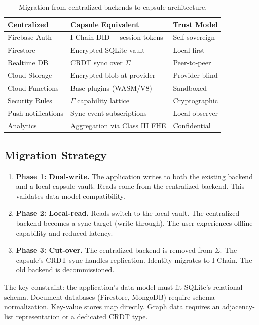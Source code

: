 \documentclass[11pt,a4paper]{article}
\begin{document}
\begin{table}[H]
\centering
\caption{Migration from centralized backends to capsule architecture.}
\label{tab:migration}
\begin{tabular}{@{}lll@{}}
\toprule
\textbf{Centralized} & \textbf{Capsule Equivalent} & \textbf{Trust Model} \\
\midrule
Firebase Auth & I-Chain DID + session tokens & Self-sovereign \\
Firestore & Encrypted SQLite vault & Local-first \\
Realtime DB & CRDT sync over $\Sigma$ & Peer-to-peer \\
Cloud Storage & Encrypted blob at provider & Provider-blind \\
Cloud Functions & Base plugins (WASM/V8) & Sandboxed \\
Security Rules & $\Gamma$ capability lattice & Cryptographic \\
Push notifications & Sync event subscriptions & Local observer \\
Analytics & Aggregation via Class III FHE & Confidential \\
\bottomrule
\end{tabular}
\end{table}

\subsection{Migration Strategy}

\begin{enumerate}[nosep]
  \item \textbf{Phase 1: Dual-write.} The application writes to both the
        existing backend and a local capsule vault. Reads come from the
        centralized backend. This validates data model compatibility.
  \item \textbf{Phase 2: Local-read.} Reads switch to the local vault.
        The centralized backend becomes a sync target (write-through).
        The user experiences offline capability and reduced latency.
  \item \textbf{Phase 3: Cut-over.} The centralized backend is removed from
        $\Sigma$. The capsule's CRDT sync handles replication. Identity
        migrates to I-Chain. The old backend is decommissioned.
\end{enumerate}

The key constraint: the application's data model must fit SQLite's relational
schema. Document databases (Firestore, MongoDB) require schema normalization.
Key-value stores map directly. Graph data requires an adjacency-list
representation or a dedicated CRDT type.
\end{document}

